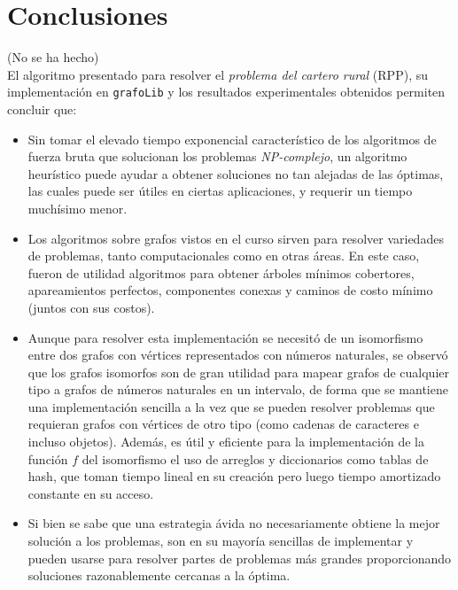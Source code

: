 \documentclass[11pt]{article}
\begin{document}
\section{Conclusiones}

(No se ha hecho) \\ 

El algoritmo presentado para resolver el \emph{problema del cartero rural} (RPP),
su implementación en \texttt{grafoLib} y los resultados 
experimentales obtenidos permiten concluir que:

\begin{itemize}
   \item Sin tomar el elevado tiempo exponencial característico de
   los algoritmos de fuerza bruta que solucionan los problemas
   \emph{NP-complejo}, un algoritmo heurístico puede ayudar a obtener
   soluciones no tan alejadas de las óptimas, las cuales puede ser
   útiles en ciertas aplicaciones, y requerir un tiempo muchísimo
   menor.

   \item Los algoritmos sobre grafos vistos en el curso sirven
   para resolver variedades de problemas, tanto computacionales
   como en otras áreas. En este caso, fueron de utilidad algoritmos
   para obtener árboles mínimos cobertores, apareamientos perfectos,
   componentes conexas y caminos de costo mínimo (juntos con sus
   costos).

   \item Aunque para resolver esta implementación se necesitó de 
   un isomorfismo entre dos grafos con vértices representados con 
   números naturales, se observó que los grafos isomorfos son de
   gran utilidad para mapear grafos de cualquier tipo a grafos de
   números naturales en un intervalo, de forma que se mantiene una
   implementación sencilla a la vez que se pueden resolver problemas
   que requieran grafos con vértices de otro tipo (como cadenas de
   caracteres e incluso objetos). Además, es útil y eficiente para
   la implementación de la función $f$ del isomorfismo el uso de arreglos
   y diccionarios como tablas de hash, que toman tiempo lineal en su
   creación pero luego tiempo amortizado constante en su acceso.

   \item Si bien se sabe que una estrategia ávida no necesariamente
   obtiene la mejor solución a los problemas, son en su mayoría
   sencillas de implementar y pueden usarse para resolver partes
   de problemas más grandes proporcionando soluciones razonablemente
   cercanas a la óptima.


\end{itemize}
\end{document}
